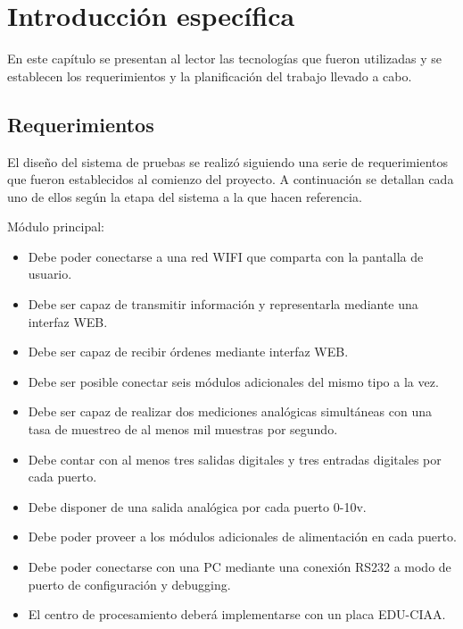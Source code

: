 \chapter{Introducción específica} %

\label{Chapter2}

En este capítulo se presentan al lector las tecnologías que fueron utilizadas y  se establecen los requerimientos y la planificación del trabajo llevado a cabo.


\section{Requerimientos}
El diseño del sistema de pruebas se realizó siguiendo una serie de requerimientos que fueron establecidos al comienzo del proyecto. A continuación se detallan cada uno de ellos según la etapa del sistema a la que hacen referencia.

Módulo principal:

\begin{itemize}
	\item Debe poder conectarse a una red WIFI que comparta con la pantalla de usuario.
	\item Debe ser capaz de transmitir información y representarla mediante una interfaz WEB.
	\item Debe ser capaz de recibir órdenes mediante interfaz WEB.
	\item Debe ser posible conectar seis módulos adicionales del mismo tipo a la vez.
	\item Debe ser capaz de realizar dos mediciones analógicas simultáneas con una tasa de 	muestreo de al menos mil muestras por segundo.
	\item Debe contar con al menos tres salidas digitales y tres entradas digitales por cada puerto. 
	\item Debe disponer de una salida analógica por cada puerto 0-10v.	
	\item Debe poder proveer a los módulos adicionales de alimentación en cada puerto.
	\item Debe poder conectarse con una PC mediante una conexión RS232 a modo de puerto de configuración y debugging.
	\item El centro de procesamiento deberá implementarse con un placa EDU-CIAA.
	
\end{itemize}

